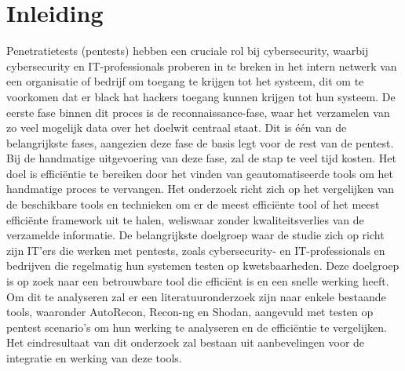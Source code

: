 


% 




\section{Inleiding}%
\label{sec:inleiding}

Penetratietests (pentests) hebben een cruciale rol bij cybersecurity, waarbij cybersecurity en IT-professionals proberen in te breken in het intern netwerk 
van een organisatie of bedrijf om toegang te krijgen tot het systeem, dit om te voorkomen dat er black hat hackers toegang kunnen krijgen tot hun systeem. 
De eerste fase binnen dit proces is de reconnaissance-fase, waar het verzamelen van zo veel mogelijk data over het doelwit centraal staat. Dit is één van de belangrijkste fases, 
aangezien deze fase de basis legt voor de rest van de pentest. Bij de handmatige uitgevoering van deze fase, zal de stap te veel tijd kosten. 
Het doel is efficiëntie te bereiken door het vinden van geautomatiseerde tools om het handmatige proces te vervangen.
Het onderzoek richt zich op het vergelijken van de beschikbare tools en technieken om er de meest efficiënte tool of het meest efficiënte framework uit te halen, weliswaar zonder kwaliteitsverlies van de verzamelde informatie.
De belangrijkste doelgroep waar de studie zich op richt zijn IT’ers die werken met pentests, zoals cybersecurity- en IT-professionals en bedrijven die regelmatig hun systemen testen op kwetsbaarheden. 
Deze doelgroep is op zoek naar een betrouwbare tool die efficiënt is en een snelle werking heeft. 
Om dit te analyseren zal er een literatuuronderzoek zijn naar enkele bestaande tools, waaronder 
AutoRecon, Recon-ng en Shodan, aangevuld met testen op pentest scenario’s om hun werking te analyseren en de efficiëntie te vergelijken. 
Het eindresultaat van dit onderzoek zal bestaan uit aanbevelingen voor de integratie en werking van deze tools.


